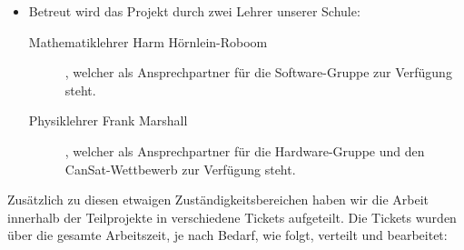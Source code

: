 \begin{itemize}
\item Betreut wird das Projekt durch zwei Lehrer unserer Schule:
\begin{description}
\item [Mathematiklehrer Harm Hörnlein-Roboom], welcher als Ansprechpartner für die Software-Gruppe zur Verfügung steht.
\item [Physiklehrer Frank Marshall], welcher als Ansprechpartner für die Hardware-Gruppe und den CanSat-Wettbewerb zur Verfügung steht.
\end{description}

\end{itemize}

Zusätzlich zu diesen etwaigen Zuständigkeitsbereichen haben wir die Arbeit innerhalb der Teilprojekte in verschiedene Tickets aufgeteilt. Die Tickets wurden über die gesamte Arbeitszeit, je nach Bedarf, wie folgt, verteilt und bearbeitet:

